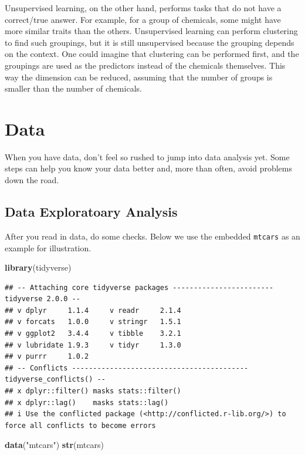 \documentclass[
]{book}
\newenvironment{Shaded}{\begin{snugshade}}{\end{snugshade}}
\newcommand{\FunctionTok}[1]{\textcolor[rgb]{0.13,0.29,0.53}{\textbf{#1}}}
\newcommand{\NormalTok}[1]{#1}
\newcommand{\StringTok}[1]{\textcolor[rgb]{0.31,0.60,0.02}{#1}}
\begin{document}
Unsupervised learning, on the other hand, performs tasks that do not have a correct/true answer. For example, for a group of chemicals, some might have more similar traits than the others. Unsupervised learning can perform clustering to find such groupings, but it is still unsupervised because the grouping depends on the context. One could imagine that clustering can be performed first, and the groupings are used as the predictors instead of the chemicals themselves. This way the dimension can be reduced, assuming that the number of groups is smaller than the number of chemicals.

\hypertarget{data}{%
\chapter{Data}\label{data}}

When you have data, don't feel so rushed to jump into data analysis yet. Some steps can help you know your data better and, more than often, avoid problems down the road.

\hypertarget{data-exploratoary-analysis}{%
\section{Data Exploratoary Analysis}\label{data-exploratoary-analysis}}

After you read in data, do some checks. Below we use the embedded \texttt{mtcars} as an example for illustration.

\begin{Shaded}
\begin{Highlighting}[]
\FunctionTok{library}\NormalTok{(tidyverse)}
\end{Highlighting}
\end{Shaded}

\begin{verbatim}
## -- Attaching core tidyverse packages ------------------------ tidyverse 2.0.0 --
## v dplyr     1.1.4     v readr     2.1.4
## v forcats   1.0.0     v stringr   1.5.1
## v ggplot2   3.4.4     v tibble    3.2.1
## v lubridate 1.9.3     v tidyr     1.3.0
## v purrr     1.0.2     
## -- Conflicts ------------------------------------------ tidyverse_conflicts() --
## x dplyr::filter() masks stats::filter()
## x dplyr::lag()    masks stats::lag()
## i Use the conflicted package (<http://conflicted.r-lib.org/>) to force all conflicts to become errors
\end{verbatim}

\begin{Shaded}
\begin{Highlighting}[]
\FunctionTok{data}\NormalTok{(}\StringTok{"mtcars"}\NormalTok{)}
\FunctionTok{str}\NormalTok{(mtcars)}
\end{Highlighting}
\end{Shaded}
\end{document}
